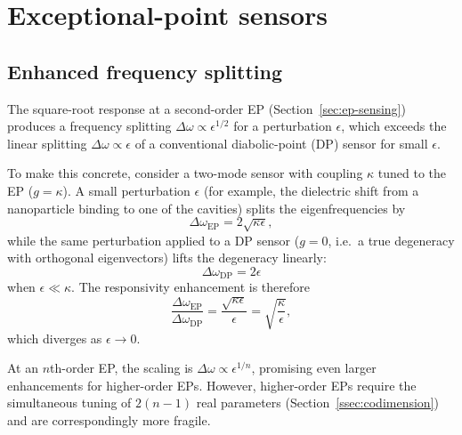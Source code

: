 \section{Exceptional-point sensors}
\label{sec:ep-sensors}

\subsection{Enhanced frequency splitting}
\label{ssec:ep-enhanced}

The square-root response at a second-order EP
(Section~\ref{sec:ep-sensing}) produces a frequency splitting
$\Delta\omega \propto \epsilon^{1/2}$ for a perturbation $\epsilon$,
which exceeds the linear splitting $\Delta\omega \propto \epsilon$ of a
conventional diabolic-point (DP) sensor for small $\epsilon$.

To make this concrete, consider a two-mode sensor with coupling
$\kappa$ tuned to the EP ($g = \kappa$). A small perturbation
$\epsilon$ (for example, the dielectric shift from a nanoparticle
binding to one of the cavities) splits the eigenfrequencies by
\begin{equation}
 \Delta\omega_{\mathrm{EP}} = 2\sqrt{\kappa\epsilon},
 \label{eq:ep-splitting}
\end{equation}
while the same perturbation applied to a DP sensor ($g = 0$, i.e.\ a
true degeneracy with orthogonal eigenvectors) lifts the degeneracy
linearly:
\begin{equation}
 \Delta\omega_{\mathrm{DP}} = 2\epsilon
 \label{eq:dp-splitting}
\end{equation}
when $\epsilon \ll \kappa$. The responsivity enhancement is therefore
\begin{equation}
 \frac{\Delta\omega_{\mathrm{EP}}}{\Delta\omega_{\mathrm{DP}}}
 = \frac{\sqrt{\kappa\epsilon}}{\epsilon}
 = \sqrt{\frac{\kappa}{\epsilon}},
 \label{eq:responsivity-enhancement}
\end{equation}
which diverges as $\epsilon \to 0$.

At an $n$th-order EP, the scaling is $\Delta\omega \propto
\epsilon^{1/n}$, promising even larger enhancements for higher-order
EPs. However, higher-order EPs require the simultaneous tuning of
$2(n-1)$ real parameters (Section~\ref{ssec:codimension}) and are
correspondingly more fragile.

